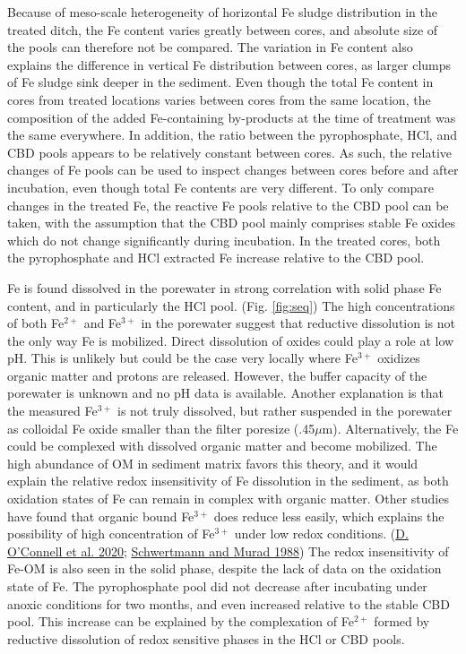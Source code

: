\documentclass[a4paper,11pt]{article}
\begin{document}
Because of meso-scale heterogeneity of horizontal Fe sludge distribution in the treated ditch, the Fe content varies greatly between cores, and absolute size of the pools can therefore not be compared. The variation in Fe content also explains the difference in vertical Fe distribution between cores, as larger clumps of Fe sludge sink deeper in the sediment. Even though the total Fe content in cores from treated locations varies between cores from the same location, the composition of the added Fe-containing by-products at the time of treatment was the same everywhere. In addition, the ratio between the pyrophosphate, HCl, and CBD pools appears to be relatively constant between cores. As such, the relative changes of Fe pools can be used to inspect changes between cores before and after incubation, even though total Fe contents are very different. To only compare changes in the treated Fe, the reactive Fe pools relative to the CBD pool can be taken, with the assumption that the CBD pool mainly comprises stable Fe oxides which do not change significantly during incubation. In the treated cores, both the pyrophosphate and HCl extracted Fe increase relative to the CBD pool.

Fe is found dissolved in the porewater in strong correlation with solid phase Fe content, and in particularly the HCl pool. (Fig. \ref{fig:seq}) The high concentrations of both Fe\(^{2+}\) and Fe\(^{3+}\) in the porewater suggest that reductive dissolution is not the only way Fe is mobilized. Direct dissolution of oxides could play a role at low pH. This is unlikely but could be the case very locally where Fe\(^{3+}\) oxidizes organic matter and protons are released. However, the buffer capacity of the porewater is unknown and no pH data is available. Another explanation is that the measured Fe\(^{3+}\) is not truly dissolved, but rather suspended in the porewater as colloidal Fe oxide smaller than the filter poresize (.45\(\mu\)m). Alternatively, the Fe could be complexed with dissolved organic matter and become mobilized. The high abundance of OM in sediment matrix favors this theory, and it would explain the relative redox insensitivity of Fe dissolution in the sediment, as both oxidation states of Fe can remain in complex with organic matter. Other studies have found that organic bound Fe\(^{3+}\) does reduce less easily, which explains the possibility of high concentration of Fe\(^{3+}\) under low redox conditions. (\protect\hyperlink{ref-oconnellChangesSedimentaryPhosphorus2020}{D. O'Connell et al. 2020}; \protect\hyperlink{ref-schwertmannNatureIronOxide1988}{Schwertmann and Murad 1988}) The redox insensitivity of Fe-OM is also seen in the solid phase, despite the lack of data on the oxidation state of Fe. The pyrophosphate pool did not decrease after incubating under anoxic conditions for two months, and even increased relative to the stable CBD pool. This increase can be explained by the complexation of Fe\(^{2+}\) formed by reductive dissolution of redox sensitive phases in the HCl or CBD pools.
\end{document}
